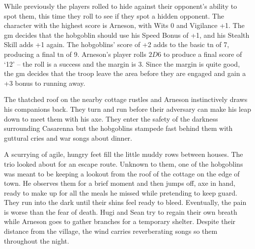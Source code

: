 \begin{exampletext}


  While previously the players rolled to hide against their opponent's ability to spot them, this time they roll to see if they spot a hidden opponent.
  The character with the highest score is Arneson, with Wits 0 and Vigilance +1.
  The \gls{gm} decides that the hobgoblin should use his Speed Bonus of +1, and his Stealth Skill adds +1 again.
  The hobgoblins' score of +2 adds to the basic \gls{tn} of 7, producing a final \gls{tn} of 9.
  Arneson's player rolls $2D6$ to produce a final score of `12' -- the roll is a success and the margin is 3.
  Since the margin is quite good, the \gls{gm} decides that the troop leave the area before they are engaged and gain a +3 bonus to running away.

  The thatched roof on the nearby cottage rustles and Arneson instinctively draws his companions back.
  They turn and run before their adversary can make his leap down to meet them with his axe.
  They enter the safety of the darkness surrounding Casarenna but the hobgoblins stampede fast behind them with guttural cries and war songs about dinner.

  A scurrying of agile, hungry feet fill the little muddy rows between houses.
  The trio looked about for an escape route.
  Unknown to them, one of the hobgoblins was meant to be keeping a lookout from the roof of the cottage on the edge of town.
  He observes them for a brief moment and then jumps off, axe in hand, ready to make up for all the meals he missed while pretending to keep guard.
  They run into the dark until their shins feel ready to bleed.
  Eventually, the pain is worse than the fear of death.
  Hugi and Sean try to regain their own breath while Arneson goes to gather branches for a temporary shelter.
  Despite their distance from the village, the wind carries reverberating songs so them throughout the night.

  \end{exampletext}

